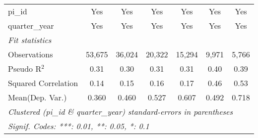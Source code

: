 \begin{tabular}{lcccccc}
   pi\_id                                                     & Yes           & Yes           & Yes            & Yes           & Yes            & Yes\\  
   quarter\_year                                              & Yes           & Yes           & Yes            & Yes           & Yes            & Yes\\  
   \midrule
   \emph{Fit statistics}\\
   Observations                                               & 53,675        & 36,024        & 20,322         & 15,294        & 9,971          & 5,766\\  
   Pseudo R$^2$                                               & 0.31          & 0.30          & 0.31           & 0.31          & 0.40           & 0.39\\  
   Squared Correlation                                        & 0.14          & 0.15          & 0.16           & 0.17          & 0.46           & 0.53\\  
Mean(Dep. Var.) & 0.360 & 0.460 & 0.527 & 0.607 & 0.492 & 0.718 \\
   \midrule \midrule
   \multicolumn{7}{l}{\emph{Clustered (pi\_id \& quarter\_year) standard-errors in parentheses}}\\
   \multicolumn{7}{l}{\emph{Signif. Codes: ***: 0.01, **: 0.05, *: 0.1}}\\
\end{tabular}
\par\endgroup
